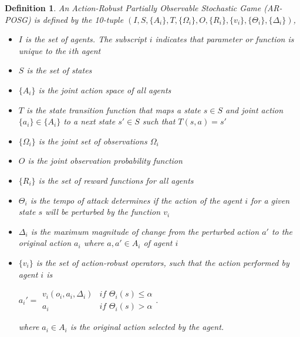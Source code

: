 \documentclass[conference,compsoc]{IEEEtran}
\newtheorem{definition}{Definition}
\begin{document}
\begin{definition}
An Action-Robust Partially Observable Stochastic Game (AR-POSG) is defined by the 10-tuple $(I, S, \{A_i\}, T, \{\Omega_i\}, O, \{R_i\}, \{v_i\}, \{\Theta_i\}, \{\Delta_i\})$,
\begin{itemize}
    \item $I$ is the set of agents. The subscript $i$ indicates that parameter or function is unique to the $i$th agent
    \item $S$ is the set of states
    \item $\{A_i\}$ is the joint action space of all agents
    \item $T$ is the state transition function that maps a state $s \in S$ and joint action $\{a_i\} \in \{A_i\}$ to a next state $s' \in S$ such that $T(s, a) = s'$
    \item $\{\Omega_i\}$ is the joint set of observations $\Omega_i$
    \item $O$ is the joint observation probability function
    \item $\{R_i\}$ is the set of reward functions for all agents
    \item $\Theta_i$ is the tempo of attack determines if the action of the agent $i$ for a given state $s$ will be perturbed by the function $v_i$
    \item $\Delta_i$ is the maximum magnitude of change from the perturbed action $a'$ to the original action $a_i$ where $ a, a' \in A_i$ of agent $i$
    \item $\{v_i\}$ is the set of action-robust operators, such that the action performed by agent $i$ is
    
    $a_i' = \begin{array}{lr}
         v_i(o_i, a_i, \Delta_i) & \textit{if } \Theta_i(s) \leq \alpha \\
         a_i & \textit{if } \Theta_i(s) > \alpha
    \end{array}$. 
    
    where $a_i \in A_i$ is the original action selected by the agent.
\end{itemize}
\label{def:ar_posg}
\end{definition}
\end{document}
